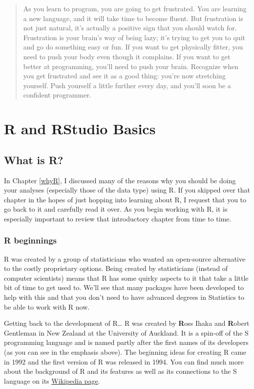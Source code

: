 \documentclass[]{tufte-book}
\begin{document}
\begin{enumerate}
  \begin{quote}
  As you learn to program, you are going to get frustrated. You are
  learning a new language, and it will take time to become fluent. But
  frustration is not just natural, it's actually a positive sign that
  you should watch for. Frustration is your brain's way of being lazy;
  it's trying to get you to quit and go do something easy or fun. If you
  want to get physically fitter, you need to push your body even though
  it complains. If you want to get better at programming, you'll need to
  push your brain. Recognize when you get frustrated and see it as a
  good thing: you're now stretching yourself. Push yourself a little
  further every day, and you'll soon be a confident programmer.
  \end{quote}
\end{enumerate}

\chapter{R and RStudio Basics}\label{rstudiobasics}

\section{What is R?}\label{what-is-r}

In Chapter \ref{whyR}, I discussed many of the reasons why you should be
doing your analyses (especially those of the data type) using R. If you
skipped over that chapter in the hopes of just hopping into learning
about R, I request that you to go back to it and carefully read it over.
As you begin working with R, it is especially important to review that
introductory chapter from time to time.

\subsection{R beginnings}\label{r-beginnings}

R was created by a group of statisticians who wanted an open-source
alternative to the costly proprietary options. Being created by
statisticians (instead of computer scientists) means that R has some
quirky aspects to it that take a little bit of time to get used to.
We'll see that many packages have been developed to help with this and
that you don't need to have advanced degrees in Statistics to be able to
work with R now.

Getting back to the development of R\ldots{} R was created by
\textbf{R}oss Ihaka and \textbf{R}obert Gentleman in New Zealand at the
University of Auckland. It is a spin-off of the S programming language
and is named partly after the first names of its developers (as you can
see in the emphasis above). The beginning ideas for creating R came in
1992 and the first version of R was released in 1994. You can find much
more about the background of R and its features as well as its
connections to the S language on its
\href{https://en.wikipedia.org/wiki/R_(programming_language)}{Wikipedia
page}.
\end{document}

